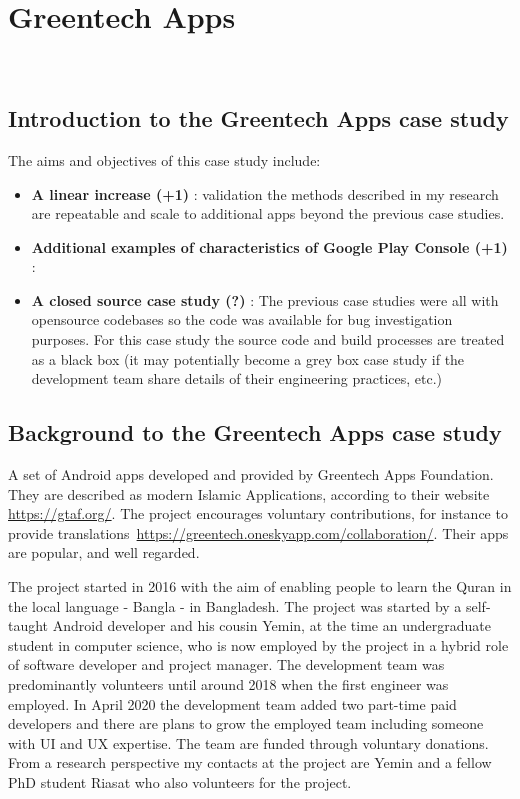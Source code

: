 \section{Greentech Apps}~\label{study-greentech-apps}

\subsection{Introduction to the Greentech Apps case study}
The aims and objectives of this case study include:

\begin{itemize}
    \item \textbf{A linear increase (+1)} : validation the methods described in my research are repeatable and scale to additional apps beyond the previous case studies.
    \item \textbf{Additional examples of characteristics of Google Play Console (+1)} :
    \item \textbf{A closed source case study (?)} : The previous case studies were all with opensource codebases so the code was available for bug investigation purposes. For this case study the source code and build processes are treated as a black box (it may potentially become a grey box case study if the development team share details of their engineering practices, etc.)
\end{itemize}

\subsection{Background to the Greentech Apps case study}
A set of Android apps developed and provided by Greentech Apps Foundation. They are described as modern Islamic Applications, according to their website \url{https://gtaf.org/}. The project encourages voluntary contributions, for instance to provide translations~\url{https://greentech.oneskyapp.com/collaboration/}. Their apps are popular, and well regarded. %


The project started in 2016 with the aim of enabling people to learn the Quran in the local language - Bangla - in Bangladesh. The project was started by a self-taught Android developer and his cousin Yemin, at the time an undergraduate student in computer science, who is now employed by the project in a hybrid role of software developer and project manager. The development team was predominantly volunteers until around 2018 when the first engineer was employed. In April 2020 the development team added two part-time paid developers and there are plans to grow the employed team including someone with UI and UX expertise. The team are funded through voluntary donations. From a research perspective my contacts at the project are Yemin and a fellow PhD student Riasat who also volunteers for the project.


